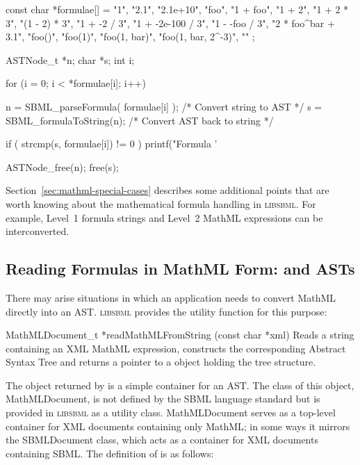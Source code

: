 \documentclass{sbmlmanual}
\newcommand{\libsbml}{\textsc{libsbml}}
\begin{document}
\begin{example}[c]
const char *formulae[] =
{
  "1",
  "2.1",
  "2.1e+10",
  "foo",
  "1 + foo",
  "1 + 2",
  "1 + 2 * 3",
  "(1 - 2) * 3",
  "1 + -2 / 3",
  "1 + -2e-100 / 3",
  "1 - -foo / 3",
  "2 * foo^bar + 3.1",
  "foo()",
  "foo(1)",
  "foo(1, bar)",
  "foo(1, bar, 2^-3)",
  ""
};


ASTNode_t *n;
char      *s;
int        i;

for (i = 0; i < *formulae[i]; i++)
{
  n = SBML_parseFormula( formulae[i] );  /* Convert string to AST */
  s = SBML_formulaToString(n);           /* Convert AST back to string */

  if ( strcmp(s, formulae[i]) != 0 ) 
  {
    printf("Formula '%
  }

  ASTNode_free(n);
  free(s);
}
\end{example}

Section~\ref{sec:mathml-special-cases} describes some additional points
that are worth knowing about the mathematical formula handling in
\libsbml{}.  For example,  Level~1 formula strings and Level~2 MathML
expressions can  be interconverted.


\subsection{Reading Formulas in MathML Form:  and ASTs}
\label{sec:mathml-math}

There may arise situations in which an application needs to convert MathML
directly into an AST.  \libsbml{} provides the utility function
 for this purpose:

\begin{methoddef}{MathMLDocument\_t *readMathMLFromString (const char *xml)}
  Reads a string containing an XML MathML expression, constructs the
  corresponding Abstract Syntax Tree and returns a pointer to a
   object holding the tree structure.
\end{methoddef}

The object returned by  is a simple
container for an AST.  The class of this object, MathMLDocument, is not
defined by the SBML language standard but is provided in \libsbml{} as a
utility class.  MathMLDocument serves as a top-level container for XML
documents containing only MathML; in some ways it mirrors the SBMLDocument
class, which acts as a container for XML documents containing SBML.  The
definition of  is as follows:
 
\end{document}

